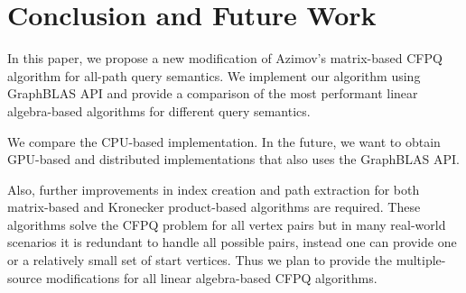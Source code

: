 \section{Conclusion and Future Work}
In this paper, we propose a new modification of Azimov's matrix-based CFPQ algorithm for all-path query semantics. We implement our algorithm using GraphBLAS API and provide a comparison of the most performant linear algebra-based algorithms for different query semantics. %

We compare the CPU-based implementation. In the future, we want to obtain GPU-based and distributed implementations that also uses the GraphBLAS API.

Also, further improvements in index creation and path extraction for both matrix-based and Kronecker product-based algorithms are required. These algorithms solve the CFPQ problem for all vertex pairs but in many real-world scenarios it is redundant to handle all possible pairs, instead one can provide one or a relatively small set of start vertices. Thus we plan to provide the multiple-source modifications for all linear algebra-based CFPQ algorithms.